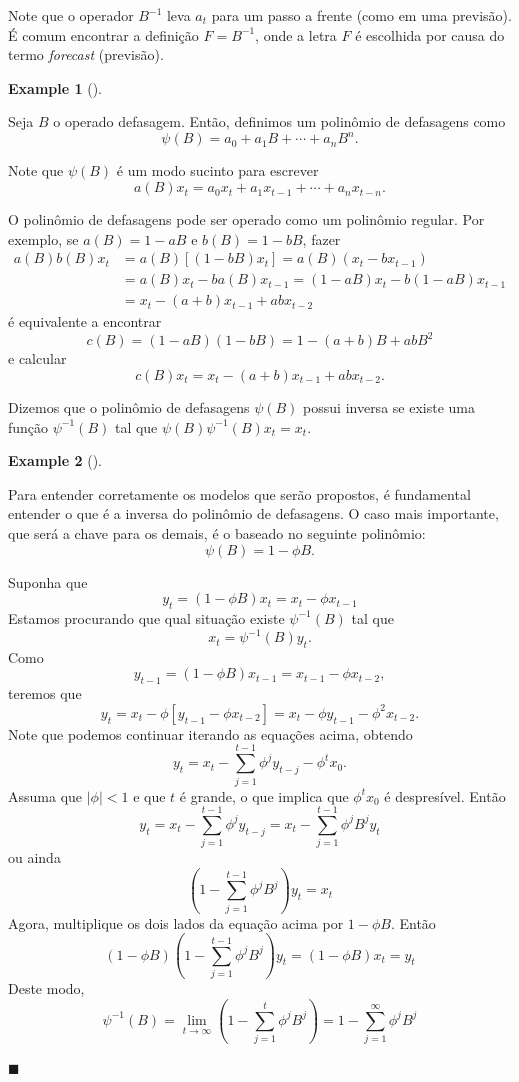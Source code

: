 \documentclass[
  letterpaper,
  DIV=11,
  numbers=noendperiod]{scrartcl}
\theoremstyle{definition}
\newtheorem{example}{Example}[chapter]
\theoremstyle{definition}
\theoremstyle{plain}
\theoremstyle{plain}
\theoremstyle{remark}
\begin{document}
Note que o operador \(B^{-1}\) leva \(a_t\) para um passo a frente (como
em uma previsão). É comum encontrar a definição \(F=B^{-1}\), onde a
letra \(F\) é escolhida por causa do termo \textit{forecast} (previsão).

\begin{example}[]\protect\hypertarget{exm-}{}\label{exm-}

Seja \(B\) o operado defasagem. Então, definimos um polinômio de
defasagens como \[\psi(B)=a_0+a_1B+\cdots+a_n B^n.\]

\end{example}

Note que \(\psi(B)\) é um modo sucinto para escrever
\[a(B)x_t=a_0x_t+a_1x_{t-1}+\cdots+a_n x_{t-n}.\]

O polinômio de defasagens pode ser operado como um polinômio regular.
Por exemplo, se \(a(B)=1-aB\) e \(b(B)=1-bB\), fazer \begin{align}
a(B)b(B)x_t&=a(B)[(1-bB)x_t]=a(B)(x_t-bx_{t-1})\\
&=a(B)x_t-ba(B)x_{t-1}=(1-aB)x_t-b(1-aB)x_{t-1}\\
&=x_t-(a+b)x_{t-1}+abx_{t-2}\end{align} é equivalente a encontrar
\[c(B)=(1-aB)(1-bB)=1-(a+b)B + abB^2\] e calcular
\[c(B)x_t=x_t-(a+b)x_{t-1}+abx_{t-2}.\]

Dizemos que o polinômio de defasagens \(\psi(B)\) possui inversa se
existe uma função \(\psi^{-1}(B)\) tal que
\(\psi(B)\psi^{-1}(B)x_t=x_t\).

\begin{example}[]\protect\hypertarget{exm-}{}\label{exm-}

Para entender corretamente os modelos que serão propostos, é fundamental
entender o que é a inversa do polinômio de defasagens. O caso mais
importante, que será a chave para os demais, é o baseado no seguinte
polinômio: \[\psi(B)=1-\phi B.\]

Suponha que \[y_t=(1-\phi B)x_t=x_t-\phi x_{t-1 }\] Estamos procurando
que qual situação existe \(\psi^{-1}(B)\) tal que
\[x_t=\psi^{-1}(B)y_t.\] Como
\[y_{t-1}=(1-\phi B)x_{t-1}=x_{t-1}-\phi x_{t-2},\] teremos que
\[y_t=x_t-\phi[y_{t-1}-\phi x_{t-2}]=x_t-\phi y_{t-1}-\phi^2x_{t-2}.\]
Note que podemos continuar iterando as equações acima, obtendo
\[y_t=x_t-\sum_{j=1}^{t-1} \phi^jy_{t-j}-\phi^{t}x_0.\] Assuma que
\(|\phi|<1\) e que \(t\) é grande, o que implica que \(\phi^t x_0\) é
despresível. Então
\[y_t=x_t-\sum_{j=1}^{t-1}\phi^j y_{t-j}=x_t-\sum_{j=1}^{t-1}\phi^j B^j y_t\]
ou ainda \[\left(1-\sum_{j=1}^{t-1}\phi^j B^j\right)y_t=x_t\] Agora,
multiplique os dois lados da equação acima por \(1-\phi B\). Então
\[(1-\phi B)\left(1-\sum_{j=1}^{t-1}\phi^j B^j\right)y_t=(1-\phi B)x_t=y_t \]
Deste modo,
\[\psi^{-1}(B)=\lim_{t\rightarrow \infty }\left(1-\sum_{j=1}^{t}\phi^j B^j\right)=1-\sum_{j=1}^{\infty}\phi^j B^j\]

\(\blacksquare\)

\end{example}
\end{document}
